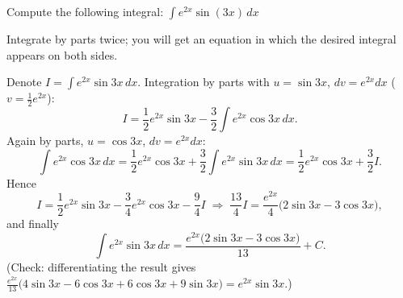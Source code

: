 
\begin{question}
Compute the following integral:
$\displaystyle\int e^{2x}\sin(3x)\,dx$
\end{question}

\begin{hint}
Integrate by parts twice; you will get an equation in which the desired integral appears on both sides.
\end{hint}

\begin{solution}
Denote $I=\int e^{2x}\sin3x\,dx$. Integration by parts with $u=\sin3x$, $dv=e^{2x}dx$ ($v=\frac12e^{2x}$):
\[ I=\frac12e^{2x}\sin3x-\frac32\int e^{2x}\cos3x\,dx. \]
Again by parts, $u=\cos3x$, $dv=e^{2x}dx$:
\[ \int e^{2x}\cos3x\,dx=\frac12e^{2x}\cos3x+\frac32\int e^{2x}\sin3x\,dx=\frac12e^{2x}\cos3x+\frac32I. \]
Hence
\[ I=\frac12e^{2x}\sin3x-\frac34e^{2x}\cos3x-\frac94I\;\Longrightarrow\;\frac{13}{4}I=\frac{e^{2x}}{4}\big(2\sin3x-3\cos3x\big), \]
and finally
\[ \int e^{2x}\sin3x\,dx=\frac{e^{2x}\big(2\sin3x-3\cos3x\big)}{13}+C. \]
(Check: differentiating the result gives $\frac{e^{2x}}{13}\big(4\sin3x-6\cos3x+6\cos3x+9\sin3x\big)=e^{2x}\sin3x$.)
\end{solution}
